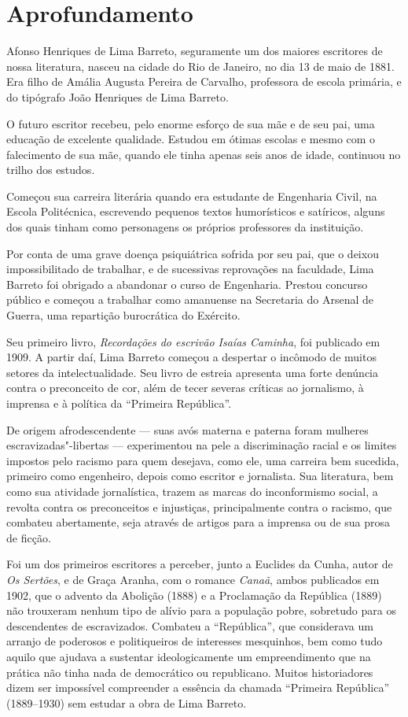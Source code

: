 \documentclass[11pt]{extarticle}
\begin{document}
\section{Aprofundamento}

Afonso Henriques de Lima Barreto, seguramente um dos maiores escritores
de nossa literatura, nasceu na cidade do Rio de Janeiro, no dia 13 de
maio de 1881. Era filho de Amália Augusta Pereira de Carvalho,
professora de escola primária, e do tipógrafo João Henriques de Lima
Barreto.

O futuro escritor recebeu, pelo enorme esforço de sua mãe e de seu pai,
uma educação de excelente qualidade. Estudou em ótimas escolas e mesmo
com o falecimento de sua mãe, quando ele tinha apenas seis anos de
idade, continuou no trilho dos estudos.

Começou sua carreira literária quando era estudante de Engenharia Civil,
na Escola Politécnica, escrevendo pequenos textos humorísticos e
satíricos, alguns dos quais tinham como personagens os próprios
professores da instituição.

Por conta de uma grave doença psiquiátrica sofrida por seu pai, que o
deixou impossibilitado de trabalhar, e de sucessivas reprovações na
faculdade, Lima Barreto foi obrigado a abandonar o curso de Engenharia.
Prestou concurso público e começou a trabalhar como amanuense na
Secretaria do Arsenal de Guerra, uma repartição burocrática do Exército.

Seu primeiro livro, \emph{Recordações do escrivão Isaías Caminha}, foi
publicado em 1909. A partir daí, Lima Barreto começou a despertar o
incômodo de muitos setores da intelectualidade. Seu livro de estreia
apresenta uma forte denúncia contra o preconceito de cor, além de tecer
severas críticas ao jornalismo, à imprensa e à política da ``Primeira
República''.

De origem afrodescendente --- suas avós materna e paterna foram mulheres
escravizadas"-libertas --- experimentou na pele a discriminação racial e
os limites impostos pelo racismo para quem desejava, como ele, uma
carreira bem sucedida, primeiro como engenheiro, depois como escritor e
jornalista. Sua literatura, bem como sua atividade jornalística, trazem
as marcas do inconformismo social, a revolta contra os preconceitos e
injustiças, principalmente contra o racismo, que combateu abertamente,
seja através de artigos para a imprensa ou de sua prosa de ficção.

Foi um dos primeiros escritores a perceber, junto a Euclides da Cunha,
autor de \emph{Os Sertões}, e de Graça Aranha, com o romance
\emph{Canaã}, ambos publicados em 1902, que o advento da Abolição (1888)
e a Proclamação da República (1889) não trouxeram nenhum tipo de alívio
para a população pobre, sobretudo para os descendentes de escravizados.
Combateu a ``República'', que considerava um arranjo de poderosos e
politiqueiros de interesses mesquinhos, bem como tudo aquilo que ajudava
a sustentar ideologicamente um empreendimento que na prática não tinha
nada de democrático ou republicano. Muitos historiadores dizem ser
impossível compreender a essência da chamada ``Primeira República''
(1889--1930) sem estudar a obra de Lima Barreto.
\end{document}

